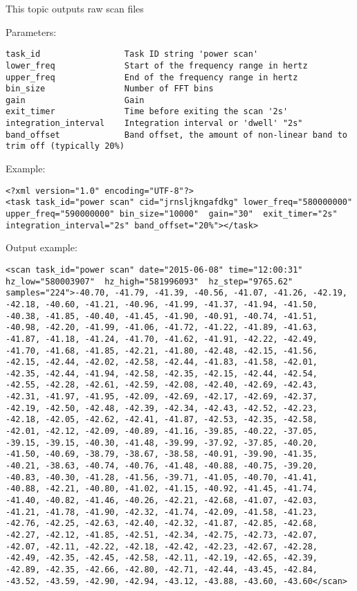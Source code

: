 This topic outputs raw scan files

Parameters:

\begin{lstlisting}
task_id                 Task ID string 'power scan'
lower_freq              Start of the frequency range in hertz
upper_freq              End of the frequency range in hertz
bin_size                Number of FFT bins
gain                    Gain
exit_timer              Time before exiting the scan '2s'
integration_interval    Integration interval or 'dwell' "2s"
band_offset             Band offset, the amount of non-linear band to trim off (typically 20%)
\end{lstlisting}

Example:

\lstset{language=XML}
\begin{lstlisting}
<?xml version="1.0" encoding="UTF-8"?>
<task task_id="power scan" cid="jrnsljkngafdkg" lower_freq="580000000" upper_freq="590000000" bin_size="10000"  gain="30"  exit_timer="2s" integration_interval="2s" band_offset="20%"></task>
\end{lstlisting}

Output example:
\begin{lstlisting}
<scan task_id="power scan" date="2015-06-08" time="12:00:31" hz_low="580003907"  hz_high="581996093"  hz_step="9765.62" samples="224">-40.70, -41.79, -41.39, -40.56, -41.07, -41.26, -42.19, -42.18, -40.60, -41.21, -40.96, -41.99, -41.37, -41.94, -41.50, -40.38, -41.85, -40.40, -41.45, -41.90, -40.91, -40.74, -41.51, -40.98, -42.20, -41.99, -41.06, -41.72, -41.22, -41.89, -41.63, -41.87, -41.18, -41.24, -41.70, -41.62, -41.91, -42.22, -42.49, -41.70, -41.68, -41.85, -42.21, -41.80, -42.48, -42.15, -41.56, -42.15, -42.44, -42.02, -42.58, -42.44, -41.83, -41.58, -42.01, -42.35, -42.44, -41.94, -42.58, -42.35, -42.15, -42.44, -42.54, -42.55, -42.28, -42.61, -42.59, -42.08, -42.40, -42.69, -42.43, -42.31, -41.97, -41.95, -42.09, -42.69, -42.17, -42.69, -42.37, -42.19, -42.50, -42.48, -42.39, -42.34, -42.43, -42.52, -42.23, -42.18, -42.05, -42.62, -42.41, -41.87, -42.53, -42.35, -42.58, -42.01, -42.12, -42.09, -40.89, -41.16, -39.85, -40.22, -37.05, -39.15, -39.15, -40.30, -41.48, -39.99, -37.92, -37.85, -40.20, -41.50, -40.69, -38.79, -38.67, -38.58, -40.91, -39.90, -41.35, -40.21, -38.63, -40.74, -40.76, -41.48, -40.88, -40.75, -39.20, -40.83, -40.30, -41.28, -41.56, -39.71, -41.05, -40.70, -41.41, -40.88, -42.21, -40.80, -41.02, -41.15, -40.92, -41.45, -41.74, -41.40, -40.82, -41.46, -40.26, -42.21, -42.68, -41.07, -42.03, -41.21, -41.78, -41.90, -42.32, -41.74, -42.09, -41.58, -41.23, -42.76, -42.25, -42.63, -42.40, -42.32, -41.87, -42.85, -42.68, -42.27, -42.12, -41.85, -42.51, -42.34, -42.75, -42.73, -42.07, -42.07, -42.11, -42.22, -42.18, -42.42, -42.23, -42.67, -42.28, -42.49, -42.35, -42.45, -42.58, -42.11, -42.19, -42.65, -42.39, -42.89, -42.35, -42.66, -42.80, -42.71, -42.44, -43.45, -42.84, -43.52, -43.59, -42.90, -42.94, -43.12, -43.88, -43.60, -43.60</scan>
\end{lstlisting}

